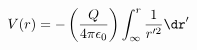 \documentclass[preview]{standalone}
\begin{document}
\begin{align*}
V(r) = - \left( \frac{Q}{4\pi \epsilon_0} \right) \int_{\infty}^{r}\frac{1}{r'^2} \dr'
\end{align*}
\end{document}
